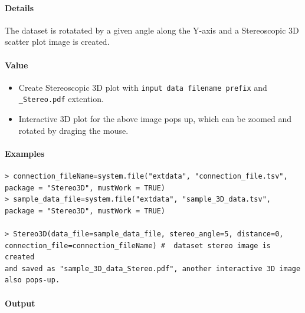 \documentclass[]{article}
\providecommand{\tightlist}{%
  \setlength{\itemsep}{0pt}\setlength{\parskip}{0pt}}
\let\oldparagraph\paragraph
\renewcommand{\paragraph}[1]{\oldparagraph{#1}\mbox{}}
\begin{document}
\paragraph{\texorpdfstring{\textbf{Details}}{Details}}\label{details}

The dataset is rotatated by a given angle along the Y-axis and a
Stereoscopic 3D scatter plot image is created.

\paragraph{\texorpdfstring{\textbf{Value}}{Value}}\label{value}

\begin{itemize}
\tightlist
\item
  Create Stereoscopic 3D plot with
  \texttt{input\ data\ filename\ prefix} and \texttt{\_Stereo.pdf}
  extention.
\item
  Interactive 3D plot for the above image pops up, which can be zoomed
  and rotated by draging the mouse.
\end{itemize}

\paragraph{\texorpdfstring{\textbf{Examples}}{Examples}}\label{examples}

\begin{verbatim}
> connection_fileName=system.file("extdata", "connection_file.tsv",
package = "Stereo3D", mustWork = TRUE)
> sample_data_file=system.file("extdata", "sample_3D_data.tsv",
package = "Stereo3D", mustWork = TRUE)

> Stereo3D(data_file=sample_data_file, stereo_angle=5, distance=0,
connection_file=connection_fileName) #  dataset stereo image is created
and saved as "sample_3D_data_Stereo.pdf", another interactive 3D image also pops-up.
\end{verbatim}

\paragraph{Output}\label{output}
\end{document}
